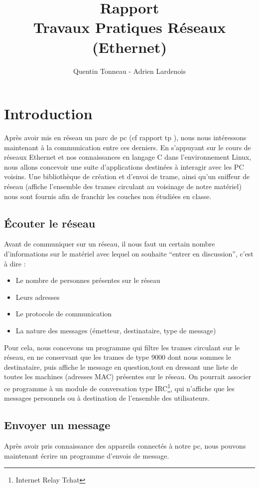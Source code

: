\documentclass[a4paper,11pt]{article}
\title {Rapport \\ Travaux Pratiques Réseaux (Ethernet)}
\author {Quentin Tonneau - Adrien Lardenois}
\date{}
\begin{document}
	\maketitle %
	\tableofcontents %
	\newpage %
	
	
	
	
	
	
	\section{Introduction}
	Après avoir mis en réseau un parc de pc (cf rapport tp ), nous nous intéressons maintenant à la communication entre ces derniers. En s'appuyant sur le cours de réseaux Ethernet et nos connaissances en langage C dans l'environnement Linux, nous allons concevoir une suite d'applications destinées à interagir avec les PC voisins. Une bibliothèque de création et d'envoi de trame, ainsi qu'un sniffeur de réseau (affiche l'ensemble des trames circulant au voisinage de notre matériel) nous sont fournis afin de franchir les couches non étudiées en classe. %
	\subsection{Écouter le réseau}
	Avant de communiquer sur un réseau, il nous faut un certain nombre d'informations sur le matériel avec lequel on souhaite ``entrer en discussion'', c'est à dire :
	\begin{itemize}
		\item Le nombre de personnes présentes sur le réseau
		\item Leurs adresses
		\item Le protocole de communication
		\item La nature des messages (émetteur, destinataire, type de message)
	\end{itemize}
	Pour cela, nous concevons un programme qui filtre les trames circulant sur le réseau, en ne conservant que les trames de type 9000 dont nous sommes le destinataire, puis affiche le message en question,tout en dressant une liste de toutes les machines (adresses MAC) présentes sur le réseau. On pourrait associer ce programme à un module de conversation type IRC\footnote{Internet Relay Tchat}, qui n'affiche que les messages personnels ou à destination de l'ensemble des utilisateurs.
	\subsection{Envoyer un message}
	Après avoir pris connaissance des appareils connectés à notre pc, nous pouvons maintenant écrire un programme d'envois de message.
\end{document}

